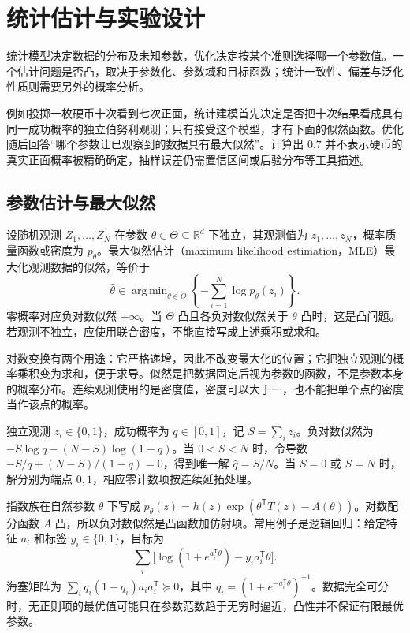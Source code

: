 \setcounter{chapter}{6} %
\chapter{统计估计与实验设计}
\label{ch:co-statistics}

统计模型决定数据的分布及未知参数，优化决定按某个准则选择哪一个参数值。一个估计问题是否凸，取决于参数化、参数域和目标函数；统计一致性、偏差与泛化性质则需要另外的概率分析。

例如投掷一枚硬币十次看到七次正面，统计建模首先决定是否把十次结果看成具有同一成功概率的独立伯努利观测；只有接受这个模型，才有下面的似然函数。优化随后回答“哪个参数让已观察到的数据具有最大似然”。计算出 $0.7$ 并不表示硬币的真实正面概率被精确确定，抽样误差仍需置信区间或后验分布等工具描述。

\section{参数估计与最大似然}

设随机观测 $Z_1,\ldots,Z_N$ 在参数 $\theta\in\Theta\subseteq\mathbb R^d$ 下独立，其观测值为 $z_1,\ldots,z_N$，概率质量函数或密度为 $p_\theta$。最大似然估计（maximum likelihood estimation，MLE）最大化观测数据的似然，等价于
\begin{equation}
 \widehat\theta\in\mathop{\mathrm{arg\,min}}_{\theta\in\Theta}
 \left\{-\sum_{i=1}^N\log p_\theta(z_i)\right\}.
 \label{eq:co-mle}
\end{equation}
零概率对应负对数似然 $+\infty$。当 $\Theta$ 凸且各负对数似然关于 $\theta$ 凸时，这是凸问题。若观测不独立，应使用联合密度，不能直接写成上述乘积或求和。

对数变换有两个用途：它严格递增，因此不改变最大化的位置；它把独立观测的概率乘积变为求和，便于求导。似然是把数据固定后视为参数的函数，不是参数本身的概率分布。连续观测使用的是密度值，密度可以大于一，也不能把单个点的密度当作该点的概率。

\begin{example}[伯努利参数]
独立观测 $z_i\in\{0,1\}$，成功概率为 $q\in[0,1]$，记 $S=\sum_i z_i$。负对数似然为 $-S\log q-(N-S)\log(1-q)$。当 $0<S<N$ 时，令导数 $-S/q+(N-S)/(1-q)=0$，得到唯一解 $\widehat q=S/N$。当 $S=0$ 或 $S=N$ 时，解分别为端点 $0,1$，相应零计数项按连续延拓处理。
\end{example}

指数族在自然参数 $\theta$ 下写成 $p_\theta(z)=h(z)\exp(\theta^{\mathsf T}T(z)-A(\theta))$。对数配分函数 $A$ 凸，所以负对数似然是凸函数加仿射项。常用例子是逻辑回归：给定特征 $a_i$ 和标签 $y_i\in\{0,1\}$，目标为
\[
 \sum_i\bigl[\log(1+e^{a_i^{\mathsf T}\theta})-y_i a_i^{\mathsf T}\theta\bigr].
\]
海塞矩阵为 $\sum_iq_i(1-q_i)a_i a_i^{\mathsf T}\succeq0$，其中 $q_i=(1+e^{-a_i^{\mathsf T}\theta})^{-1}$。数据完全可分时，无正则项的最优值可能只在参数范数趋于无穷时逼近，凸性并不保证有限最优参数。

